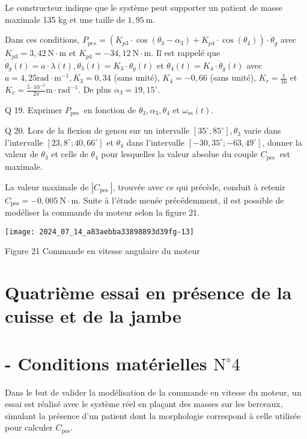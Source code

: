 Le constructeur indique que le système peut supporter un patient de masse maximale 135 kg et une taille de $1,95 \mathrm{~m}$.

Dans ces conditions, $P_{p e s}=\left(K_{p 3} \cdot \cos \left(\theta_{3}-\alpha_{3}\right)+K_{p 4} \cdot \cos \left(\theta_{4}\right)\right) \cdot \dot{\theta}_{g}$ avec $K_{p 3}=3,42 \mathrm{~N} \cdot \mathrm{m}$ et $K_{p 4}=-34,12 \mathrm{~N} \cdot \mathrm{m}$. Il est rappelé que $\dot{\theta}_{g}(t)=a \cdot \dot{\lambda}(t), \dot{\theta}_{3}(t)=K_{3} \cdot \dot{\theta}_{g}(t)$ et $\dot{\theta}_{4}(t)=K_{4} \cdot \dot{\theta}_{g}(t)$ avec $a=4,25 \mathrm{rad} \cdot \mathrm{m}^{-1}, K_{3}=0,34$ (sans unité), $K_{4}=-0,66$ (sans unité), $K_{r}=\frac{1}{16}$ et $K_{v}=\frac{5 \cdot 10^{-3}}{2 \pi} \mathrm{m} \cdot \mathrm{rad}^{-1}$. De plus $\alpha_{3}=19,15^{\circ}$.

Q 19. Exprimer $P_{\text {pes }}$ en fonction de $\theta_{3}, \alpha_{3}, \theta_{4}$ et $\omega_{m}(t)$.

Q 20. Lors de la flexion de genou sur un intervalle $\left[35^{\circ}, 85^{\circ}\right], \theta_{3}$ varie dans l'intervalle $\left[23,8^{\circ} ; 40,66^{\circ}\right]$ et $\theta_{4}$ dans l'intervalle $\left[-30,35^{\circ} ;-63,49^{\circ}\right]$, donner la valeur de $\theta_{3}$ et celle de $\theta_{4}$ pour lesquelles la valeur absolue du couple $C_{\text {pes }}$ est maximale.

La valeur maximale de $\left|C_{\text {pes }}\right|$, trouvée avec ce qui précède, conduit à retenir $C_{\mathrm{pes}}=-0,005 \mathrm{~N} \cdot \mathrm{m}$. Suite à l'étude menée précédemment, il est possible de modéliser la commande du moteur selon la figure 21.

\begin{center}
\texttt{[image: 2024\_07\_14\_a83aebba33898893d39fg-13]}
\end{center}

Figure 21 Commande en vitesse angulaire du moteur

\section*{Quatrième essai en présence de la cuisse et de la jambe}
\section*{- Conditions matérielles $\mathrm{N}^{\circ} 4$}
Dans le but de valider la modélisation de la commande en vitesse du moteur, un essai est réalisé avec le système réel en plaçant des masses sur les berceaux, simulant la présence d'un patient dont la morphologie correspond à celle utilisée pour calculer $C_{\mathrm{pes}}$.

